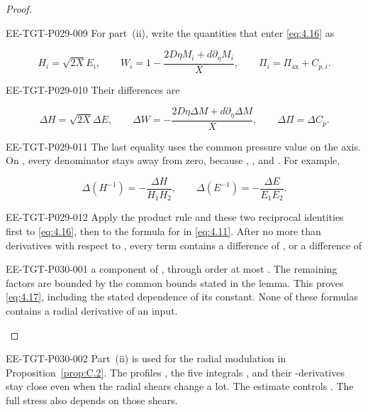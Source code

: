 \begin{proof}
\begin{EESegment}{EE-TGT-P029-009}
For part~\textup{(ii)}, write the quantities that enter \eqref{eq:4.16} as
\end{EESegment}
\[
 H_i=\sqrt{2X}E_i,
 \qquad
 W_i=1-\frac{2D\eta M_i+d\partial_\eta M_i}{X},
 \qquad
 \Pi_i=\Pi_{\mathrm{ax}}+C_{p,i}.
\]
\begin{EESegment}{EE-TGT-P029-010}
Their differences are
\end{EESegment}
\[
 \Delta H=\sqrt{2X}\Delta E,
 \qquad
 \Delta W=-\frac{2D\eta\Delta M+d\partial_\eta\Delta M}{X},
 \qquad
 \Delta\Pi=\Delta C_p.
\]
\begin{EESegment}{EE-TGT-P029-011}
The last equality uses the common pressure value on the axis. On
, every denominator stays away from zero,
because ,
, and
. For example,
\end{EESegment}
\[
 \Delta(H^{-1})=-\frac{\Delta H}{H_1H_2},
 \qquad
 \Delta(E^{-1})=-\frac{\Delta E}{E_1E_2}.
\]
\begin{EESegment}{EE-TGT-P029-012}
Apply the product rule and these two reciprocal identities first to
\eqref{eq:4.16}, then to the formula for
 in \eqref{eq:4.11}. After no more than
 derivatives with respect to
, every term contains a difference of
, or a difference of
\end{EESegment}
%
\begin{EESegment}{EE-TGT-P030-001}
a component of , through order at most
. The remaining factors are bounded by the common
bounds stated in the lemma. This proves \eqref{eq:4.17}, including the stated
dependence of its constant. None of these formulas contains a radial
derivative of an input.
\end{EESegment}
\end{proof}

\begin{EESegment}{EE-TGT-P030-002}
Part~\textup{(ii)} is used for the radial modulation in
Proposition~\ref{prop:C.2}. The profiles , the five
integrals , and their
-derivatives stay close even when the radial shears
 change a lot. The estimate controls
. The full stress
 also depends on those
shears.
\end{EESegment}

